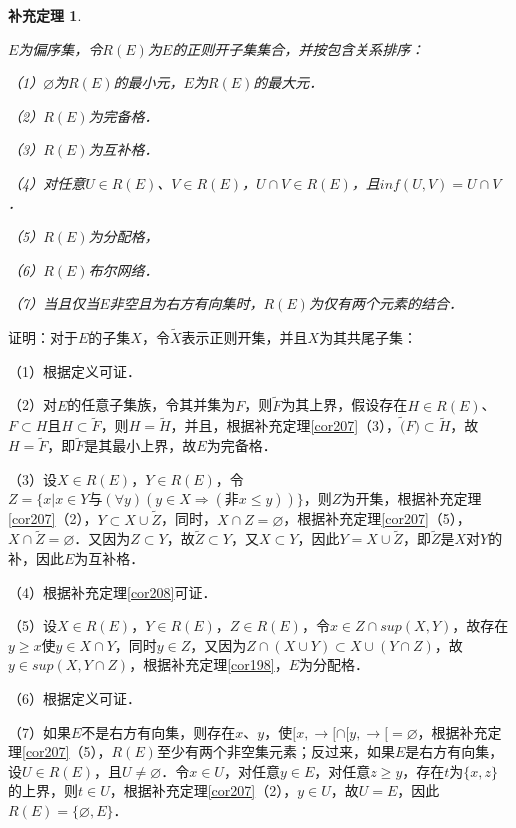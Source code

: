 \documentclass[12pt, a4paper, oneside]{book}
\newtheorem{cor}{补充定理}
\begin{document}
			\begin{cor}\label{cor209}
				\hfill\par
				$E$为偏序集，令$R(E)$为$E$的正则开子集集合，并按包含关系排序：
				\par
				（1）$\varnothing$为$R(E)$的最小元，$E$为$R(E)$的最大元．
				\par
				（2）$R(E)$为完备格．
				\par
				（3）$R(E)$为互补格．
				\par
				（4）对任意$U\in R(E)$、$V\in R(E)$，$U\cap V\in R(E)$，且$inf(U, V)= U\cap V$．
				\par
				（5）$R(E)$为分配格，
				\par
				（6）$R(E)$布尔网络．
				\par
				（7）当且仅当$E$非空且为右方有向集时，$R(E)$为仅有两个元素的结合．
			\end{cor}
			证明：对于$E$的子集$X$，令$\tilde{X}$表示正则开集，并且$X$为其共尾子集：
			\par
			（1）根据定义可证．
			\par
			（2）对$E$的任意子集族，令其并集为$F$，则$\tilde{F}$为其上界，假设存在$H \in R(E)$、$F\subset H$且$H\subset \tilde{F}$，则$H=\tilde{H}$，并且，根据补充定理\ref{cor207}（3），$\tilde(F)\subset \tilde{H}$，故$H=\tilde{F}$，即$\tilde{F}$是其最小上界，故$E$为完备格．
			\par
			（3）设$X\in R(E)$，$Y\in R(E)$，令$Z=\{x|x\in Y\text{与}(\forall y)(y\in X\Rightarrow (\text{非}x\leq y))\}$，则$Z$为开集，根据补充定理\ref{cor207}（2），$Y\subset X\cup \tilde{Z}$，同时，$X\cap Z=\varnothing$，根据补充定理\ref{cor207}（5），$X\cap \tilde{Z}=\varnothing$．又因为$Z\subset Y$，故$\tilde{Z}\subset Y$，又$X\subset Y$，因此$Y=X\cup \tilde{Z}$，即$\tilde{Z}$是$X$对$Y$的补，因此$E$为互补格．
			\par
			（4）根据补充定理\ref{cor208}可证．
			\par
			（5）设$X\in R(E)$，$Y\in R(E)$，$Z\in R(E)$，令$x\in Z\cap sup(X, Y)$，故存在$y\geq x$使$y\in X\cap Y$，同时$y\in Z$，又因为$Z\cap (X\cup Y)\subset X\cup(Y\cap Z)$，故$y\in sup(X, Y\cap Z)$，根据补充定理\ref{cor198}，$E$为分配格．
			\par
			（6）根据定义可证．
			\par
			（7）如果$E$不是右方有向集，则存在$x$、$y$，使$[x, \to [\cap [y, \to [=\varnothing$，根据补充定理\ref{cor207}（5），$R(E)$至少有两个非空集元素；反过来，如果$E$是右方有向集，设$U\in R(E)$，且$U\neq \varnothing$．令$x\in U$，对任意$y\in E$，对任意$z\geq y$，存在$t$为$\{x, z\}$的上界，则$t\in U$，根据补充定理\ref{cor207}（2），$y\in U$，故$U=E$，因此$R(E)=\{\varnothing, E\}$．
\end{document}
